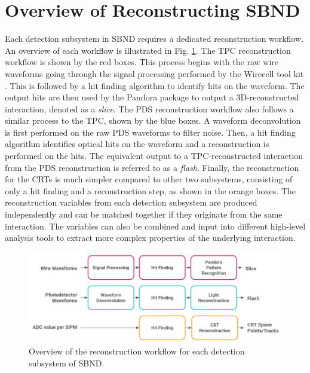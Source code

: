 \newpage


\section{Overview of Reconstructing SBND}
\label{sec:reco_overview}

Each detection subsystem in SBND requires a dedicated reconstruction workflow.
An overview of each workflow is illustrated in Fig. \ref{fig:Reco_Workflow}.
The TPC reconstruction workflow is shown by the red boxes.
This process begins with the raw wire waveforms going through the signal processing performed by the Wirecell tool kit \cite{wirecell}.
This is followed by a hit finding algorithm to identify hits on the waveform.
The output hits are then used by the Pandora package \cite{pandora} to output a 3D-reconstructed interaction, denoted as a \textit{slice}.
The PDS reconstruction workflow also follows a similar process to the TPC, shown by the blue boxes.
A waveform deconvolution is first performed on the raw PDS waveforms to filter noise.
Then, a hit finding algorithm identifies optical hits on the waveform and a reconstruction is performed on the hits.
The equivalent output to a TPC-reconstructed interaction from the PDS reconstruction is referred to as a \textit{flash}.
Finally, the reconstruction for the CRTs is much simpler compared to other two subsystems, consisting of only a hit finding and a reconstruction step, as shown in the orange boxes.
The reconstruction variables from each detection subsystem are produced independently and can be matched together if they originate from the same interaction. 
The variables can also be combined and input into different high-level analysis tools to extract more complex properties of the underlying interaction. 

\begin{figure}[htbp!] 
\centering    
\includegraphics[width=1.0\textwidth]{Reco_Workflow}
\caption[Reco_Workflow]{
Overview of the reconstruction workflow for each detection subsystem of SBND.
}
\label{fig:Reco_Workflow}
\end{figure}

